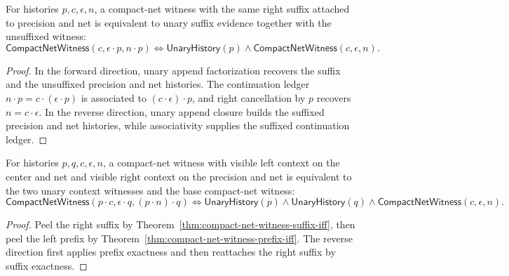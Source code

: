 \begin{theorem}
\label{thm:compact-net-witness-suffix-iff}
For histories $p,c,\epsilon,n$, a compact-net witness with the same right
suffix attached to precision and net is equivalent to unary suffix evidence
together with the unsuffixed witness:
$$
\mathsf{CompactNetWitness}(c,\epsilon\cdot p,n\cdot p)
\Longleftrightarrow
\mathsf{UnaryHistory}(p)\wedge
\mathsf{CompactNetWitness}(c,\epsilon,n).
$$
\end{theorem}
\begin{proof}
In the forward direction, unary append factorization recovers the suffix and
the unsuffixed precision and net histories. The continuation ledger
$n\cdot p=c\cdot(\epsilon\cdot p)$ is associated to
$(c\cdot\epsilon)\cdot p$, and right cancellation by $p$ recovers
$n=c\cdot\epsilon$. In the reverse direction, unary append closure builds the
suffixed precision and net histories, while associativity supplies the
suffixed continuation ledger.
\end{proof}

\begin{theorem}
\label{thm:compact-net-witness-visible-context-iff}
For histories $p,q,c,\epsilon,n$, a compact-net witness with visible left
context on the center and net and visible right context on the precision and
net is equivalent to the two unary context witnesses and the base compact-net
witness:
$$
\mathsf{CompactNetWitness}(p\cdot c,\epsilon\cdot q,(p\cdot n)\cdot q)
\Longleftrightarrow
\mathsf{UnaryHistory}(p)\wedge
\mathsf{UnaryHistory}(q)\wedge
\mathsf{CompactNetWitness}(c,\epsilon,n).
$$
\end{theorem}
\begin{proof}
Peel the right suffix by Theorem~\ref{thm:compact-net-witness-suffix-iff}, then
peel the left prefix by Theorem~\ref{thm:compact-net-witness-prefix-iff}. The
reverse direction first applies prefix exactness and then reattaches the right
suffix by suffix exactness.
\end{proof}
